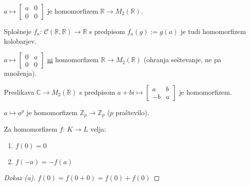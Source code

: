 \documentclass[11pt, a4paper]{article}
\begin{document}
    \begin{example}
        \(a \mapsto 
        \begin{bmatrix} 
            a & 0 \\ 
            0 & 0 
        \end{bmatrix}\) 
        je homomorfizem \(\mathbb{R} \rightarrow M_2(\mathbb{R})\).
    \end{example}

    \begin{example}
        Splošneje \(f_a\): \(\mathscr{C}(\mathbb{R}, \mathbb{R}) \rightarrow \mathbb{R}\) s predpisom \(f_a(g) := g(a)\) je tudi homomorfizem kolobarjev.
    \end{example}

    \begin{example}
        \(a \mapsto 
            \begin{bmatrix} 
                0 & a \\ 
                0 & 0 
            \end{bmatrix}\) 
        \underline{ni} homomorfizem \(\mathbb{R} \rightarrow M_2(\mathbb{R})\) (ohranja seštevanje, ne pa množenja).
    \end{example}

    \begin{example}
        Preslikava \(\mathbb{C} \rightarrow M_2(\mathbb{R})\) s predpisom \(a + bi \mapsto 
            \begin{bmatrix}
                a & b \\
                -b & a
            \end{bmatrix}\)
        je homomorfizem.
    \end{example}

    \begin{example}
        \(a \mapsto a^p\) je homomorfizem \(\mathbb{Z}_p \rightarrow \mathbb{Z}_p\) (\(p\) praštevilo).
    \end{example}

    \begin{proposition}
        Za homomorfizem \(f\): \(K \rightarrow L\) velja:
        \begin{enumerate}[label=\alph*)]
            \item \(f(0) = 0\)
            \item \(f(-a) = -f(a)\)
        \end{enumerate}
    \end{proposition}
    
    \begin{proof}[Dokaz \emph{(a)}]
        \(f(0) = f(0 + 0) = f(0) + f(0)\)
    \end{proof}
\end{document}
